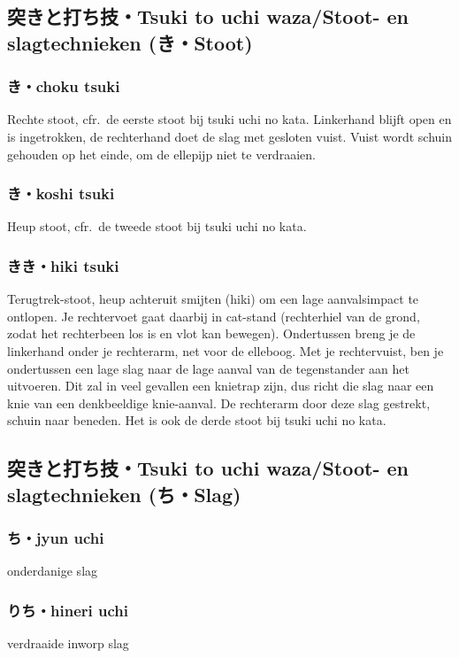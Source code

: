 \subsection{突きと打ち技・Tsuki to uchi waza/Stoot- en slagtechnieken ({\bfseries{}き・Stoot})}
\subsubsection{き・choku tsuki}
Rechte stoot, cfr.\ de eerste stoot bij tsuki uchi no kata. Linkerhand blijft open en is ingetrokken, de rechterhand doet de slag met gesloten vuist. Vuist wordt schuin gehouden op het einde, om de ellepijp niet te verdraaien.

\subsubsection{き・koshi tsuki}
Heup stoot, cfr.\ de tweede stoot bij tsuki uchi no kata.

\subsubsection{きき・hiki tsuki}
Terugtrek-stoot, heup achteruit smijten (hiki) om een lage aanvalsimpact te ontlopen. Je rechtervoet gaat daarbij in cat-stand (rechterhiel van de grond, zodat het rechterbeen los is en vlot kan bewegen). Ondertussen breng je de linkerhand onder je rechterarm, net voor de elleboog. Met je rechtervuist, ben je ondertussen een lage slag naar de lage aanval van de tegenstander aan het uitvoeren. Dit zal in veel gevallen een knietrap zijn, dus richt die slag naar een knie van een denkbeeldige knie-aanval. De rechterarm door deze slag gestrekt, schuin naar beneden. Het is ook de derde stoot bij tsuki uchi no kata.

\subsection{突きと打ち技・Tsuki to uchi waza/Stoot- en slagtechnieken ({\bfseries{}ち・Slag})}
\subsubsection{ち・jyun uchi}
onderdanige slag

\subsubsection{りち・hineri uchi}
verdraaide inworp slag

